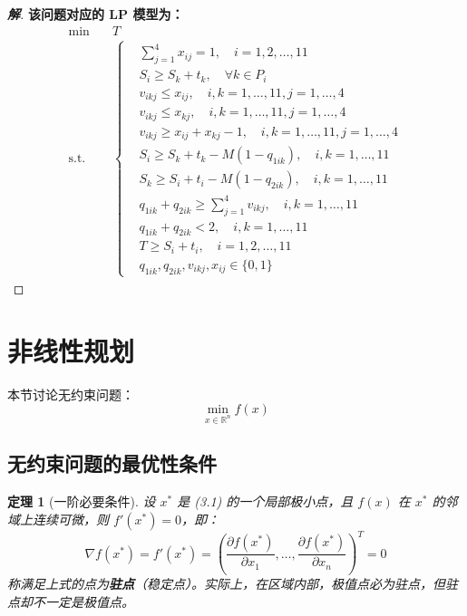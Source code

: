 \documentclass[a4paper,12pt]{ctexart} %
\newtheorem{theorem}{定理}[section]
\newenvironment{solution}{\begin{proof}[\textbf{解}]}{\end{proof}}
\begin{document}
\begin{solution}
		\bigskip
		\textbf{该问题对应的 LP 模型为：}
		\[
		\begin{aligned}
			\min \quad & T \\
			\text{s.t.} \quad & \left\{
			\begin{aligned}
				& \sum_{j=1}^{4} x_{ij} = 1, \quad i = 1, 2, \dots, 11 \\
				& S_i \ge S_k + t_k, \quad \forall k \in P_i \\
				& v_{ikj} \le x_{ij}, \quad i, k = 1, \dots, 11, j = 1, \dots, 4 \\
				& v_{ikj} \le x_{kj}, \quad i, k = 1, \dots, 11, j = 1, \dots, 4 \\
				& v_{ikj} \ge x_{ij} + x_{kj} - 1, \quad i, k = 1, \dots, 11, j = 1, \dots, 4 \\
				& S_i \ge S_k + t_k - M(1 - q_{1ik}), \quad i, k = 1, \dots, 11 \\
				& S_k \ge S_i + t_i - M(1 - q_{2ik}), \quad i, k = 1, \dots, 11 \\
				& q_{1ik} + q_{2ik} \ge \sum_{j=1}^{4} v_{ikj}, \quad i, k = 1, \dots, 11 \\
				& q_{1ik} + q_{2ik} < 2, \quad i, k = 1, \dots, 11 \\
				& T \ge S_i + t_i, \quad i = 1, 2, \dots, 11 \\
				& q_{1ik}, q_{2ik}, v_{ikj}, x_{ij} \in \{0, 1\}
			\end{aligned}
			\right.
		\end{aligned}
		\]
	\end{solution}
	
	\section{非线性规划}
	
	本节讨论无约束问题：
	\begin{equation}
		\min_{x \in \mathbb{R}^n} f(x) \tag{3.1}
	\end{equation}
	
	\subsection{无约束问题的最优性条件}
	
	\begin{theorem}[一阶必要条件]
		设 $x^*$ 是 (3.1) 的一个局部极小点，且 $f(x)$ 在 $x^*$ 的邻域上连续可微，则 $f'(x^*) = 0$，即：
		\begin{equation}
			\nabla f(x^*) = f'(x^*) = \left( \frac{\partial f(x^*)}{\partial x_1}, \dots, \frac{\partial f(x^*)}{\partial x_n} \right)^T = 0
		\end{equation}
		称满足上式的点为\textbf{驻点}（稳定点）。实际上，在区域内部，极值点必为驻点，但驻点却不一定是极值点。
	\end{theorem}
	
\end{document}

